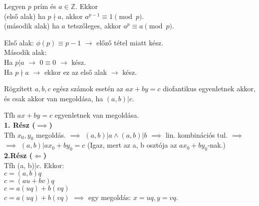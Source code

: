\begin{frame}
\begin{tcolorbox}[title={Tétel: (Kis) Fermat tétel}]
Legyen $p$ prím és $a \in \mathbb{Z}$. Ekkor\\
(első alak) ha $p \nmid a$, akkor $a^{p-1} \equiv 1 \pmod{p}$.\\
(második alak) ha $a$ tetszőleges, akkor $a^p \equiv a \pmod{p}$.

\end{tcolorbox}

\begin{tcolorbox}[title={Bizonyítás}]
Első alak: ${\phi}(p) \equiv p - 1$ $\rightarrow$ előző tétel miatt kész.\\
\bigskip
Második alak:\\
Ha $p|a$ $\rightarrow$ $0 \equiv 0$ $\rightarrow$ kész.\\
Ha $p{\nmid}a$ $\rightarrow$ ekkor ez az első alak $\rightarrow$ kész.

\end{tcolorbox}
\end{frame}

\begin{frame}
\begin{tcolorbox}[title={Tétel: A diofantikus egyenlet megoldása}]
Rögzített $a, b, c$ egész számok esetén az \textbf{$ax + by = c$} diofantikus egyenletnek akkor, és csak akkor van megoldása, ha $(a, b)|c$.
\end{tcolorbox}

\begin{tcolorbox}[title={Bizonyítás}]
Tfh $ax + by = c$ egyenletnek van megoldása.\\
\textbf{1. Rész ($\implies$)}\\
\smallskip
Tfh $x_0, y_0$ megoldás. $\implies$ $(a, b)|a \land (a, b)|b$ $\implies$ lin. kombinációs tul. $\implies$\\
$\implies$ $(a, b)|ax_0 + by_0 = c$ (Igaz, mert az a, b osztója az $ax_0 + by_0$-nak.)\\
\bigskip
\textbf{2.Rész ($\Longleftarrow$)}\\
\smallskip
Tfh (a, b)|c. Ekkor:\\
$c = (a, b)q$\\
$c = (au + bv)q$\\
$c = a(uq) + b(vq)$\\
$c = a(uq) + b(vq)$ $\implies$ egy megoldás: $x = uq, y = vq$.\\
\end{tcolorbox}
\end{frame}

